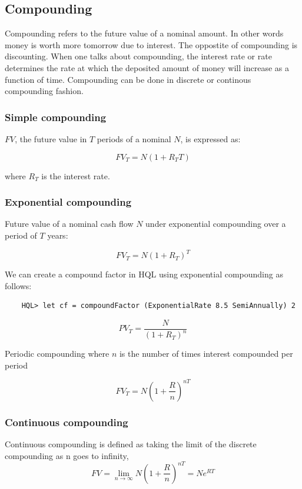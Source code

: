 \documentclass[11pt,a4paper]{article}
\numberwithin{equation}{section}
\begin{document}
\subsection{Compounding}
	Compounding refers to the future value of a nominal amount. In other words money is worth more tomorrow due to interest. The oppostite of compounding is discounting.
	When one talks about compounding, the interest rate or rate determines the rate at which the deposited amount of money will increase as a function of time.
	Compounding can be done in discrete or continous compounding fashion.


	\subsubsection{Simple compounding}
	$FV$, the future value in $T$ periods of a nominal $N$, is expressed as:

	\[
	FV_T = N(1+R_TT)
	\]

	where $R_T$ is the interest rate.

	\subsubsection{Exponential compounding}

	Future value of a nominal cash flow $N$ under exponential compounding over a period of
	$T$ years:

	\[ FV_T = N(1+R_T)^T \]


	We can create a compound factor in HQL using  exponential compounding as follows:

	\FrameSep
	\begin{lstlisting}
	HQL> let cf = compoundFactor (ExponentialRate 8.5 SemiAnnually) 2
	\end{lstlisting}
	\FrameSep

	\[ PV_T = \frac{N}{(1+R_T)^n} \]

	Periodic compounding where $n$ is the number of times interest compounded per period

	\[
	FV_T=N\left( 1 + \frac{R}{n}  \right)^{nT}
	\]

	\subsubsection{Continuous compounding}
	Continuous compounding is defined as taking the limit of the discrete compounding as n goes to infinity,
	\[
	FV=\lim_{n \to \infty} N \left(1+\frac{R}{n}\right)^{nT}=Ne^{RT}
	\]
\end{document}

